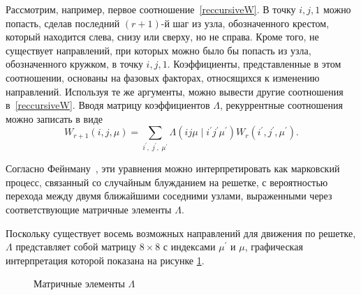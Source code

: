 \documentclass[utf8,12pt]{jetp}
\begin{document}
Рассмотрим, например, первое соотношение~\eqref{reccursiveW}. В точку $i, j, 1$ можно попасть, сделав последний $(r + 1)$-й шаг из узла, обозначенного крестом, который находится слева, снизу или сверху, но не справа. Кроме того, не существует направлений, при которых можно было бы попасть из узла, обозначенного кружком, в точку $i, j, 1$. Коэффициенты, представленные в этом соотношении, основаны на фазовых факторах, относящихся к изменению направлений. Используя те же аргументы, можно вывести другие соотношения в~\eqref{reccursiveW}. Вводя матрицу коэффициентов $\Lambda$, рекуррентные соотношения можно записать в виде
\begin{equation}
W_{r+1}(i, j, \mu) = \sum_{i^{'},\; j^{'},\; \mu^{'}} \Lambda (ij\mu\; |\; i^{'}j^{'}\mu^{'}) W_{r} (i^{'}, j^{'}, \mu^{'}).
\end{equation}

Согласно Фейнману~\cite{feynman1972}, эти уравнения можно интерпретировать как марковский процесс, связанный со случайным блужданием на решетке, с вероятностью перехода между двумя ближайшими соседними узлами, выраженными через соответствующие матричные элементы $\Lambda$.

Поскольку существует восемь возможных направлений для движения по решетке, $\Lambda$ представляет собой матрицу $8 \times 8$ с индексами $\mu^{'}$ и $\mu$, графическая интерпретация которой показана на рисунке \ref{matxgen}. 

\begin{figure}[h]
	\caption{Матричные элементы $\Lambda$}
	\label{matxgen}
\end{figure}
\end{document}
